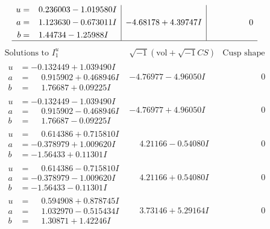 \documentclass[1p]{elsarticle_modified}
\theoremstyle{definition}
\newcommand{\I}{\sqrt{-1}}
\begin{document}
$$\begin{array}{c|c|c}
\begin{aligned}
u &= \phantom{-}0.236003 - 1.019580 I \\
a &= \phantom{-}1.123630 - 0.673011 I \\
b &= \phantom{-}1.44734 - 1.25988 I\end{aligned}
 & -4.68178 + 4.39747 I & \phantom{-0.000000 } 0\\
 \hline 
 \end{array}$$\newpage$$\begin{array}{c|c|c}  
\text{Solutions to }I^u_{1}& \I (\text{vol} + \sqrt{-1}CS) & \text{Cusp shape}\\
 \hline 
\begin{aligned}
u &= -0.132449 + 1.039490 I \\
a &= \phantom{-}0.915902 + 0.468946 I \\
b &= \phantom{-}1.76687 + 0.09225 I\end{aligned}
 & -4.76977 - 4.96050 I & \phantom{-0.000000 } 0 \\ \hline\begin{aligned}
u &= -0.132449 - 1.039490 I \\
a &= \phantom{-}0.915902 - 0.468946 I \\
b &= \phantom{-}1.76687 - 0.09225 I\end{aligned}
 & -4.76977 + 4.96050 I & \phantom{-0.000000 } 0 \\ \hline\begin{aligned}
u &= \phantom{-}0.614386 + 0.715810 I \\
a &= -0.378979 + 1.009620 I \\
b &= -1.56433 + 0.11301 I\end{aligned}
 & \phantom{-}4.21166 - 0.54080 I & \phantom{-0.000000 } 0 \\ \hline\begin{aligned}
u &= \phantom{-}0.614386 - 0.715810 I \\
a &= -0.378979 - 1.009620 I \\
b &= -1.56433 - 0.11301 I\end{aligned}
 & \phantom{-}4.21166 + 0.54080 I & \phantom{-0.000000 } 0 \\ \hline\begin{aligned}
u &= \phantom{-}0.594908 + 0.878745 I \\
a &= \phantom{-}1.032970 - 0.515434 I \\
b &= \phantom{-}1.30871 + 1.42246 I\end{aligned}
 & \phantom{-}3.73146 + 5.29164 I & \phantom{-0.000000 } 0 \\ \hline\begin{aligned}

\end{aligned}
\end{array}$$
\end{document}

